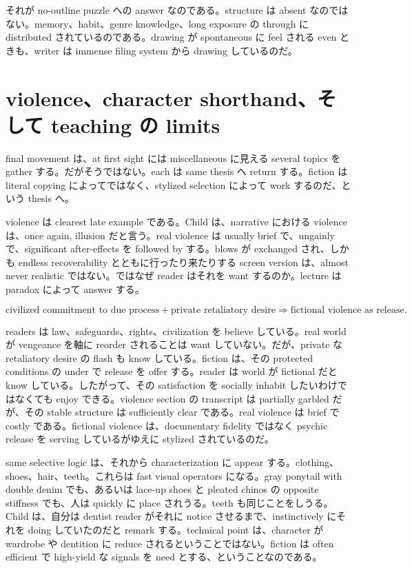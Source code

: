それが no-outline puzzle への answer なのである。structure は absent なのではない。memory、habit、genre knowledge、long exposure の through に distributed されているのである。drawing が spontaneous に feel される even ときも、writer は immense filing system から drawing しているのだ。

\section{violence、character shorthand、そして teaching の limits}

final movement は、at first sight には miscellaneous に見える several topics を gather する。だがそうではない。each は same thesis へ return する。fiction は literal copying によってではなく、stylized selection によって work するのだ、という thesis へ。

violence は clearest late example である。Child は、narrative における violence は、once again, illusion だと言う。real violence は usually brief で、ungainly で、significant after-effects を followed by する。blows が exchanged され、しかも endless recoverability とともに行ったり来たりする screen version は、almost never realistic ではない。ではなぜ reader はそれを want するのか。lecture は paradox によって answer する。

\begin{equation}
\text{civilized commitment to due process} + \text{private retaliatory desire}
\Longrightarrow
\text{fictional violence as release}.
\end{equation}

readers は law、safeguards、rights、civilization を believe している。real world が vengeance を軸に reorder されることは want していない。だが、private な retaliatory desire の flash も know している。fiction は、その protected conditions の under で release を offer する。reader は world が fictional だと know している。したがって、その satisfaction を socially inhabit したいわけではなくても enjoy できる。violence section の transcript は partially garbled だが、その stable structure は sufficiently clear である。real violence は brief で costly である。fictional violence は、documentary fidelity ではなく psychic release を serving しているがゆえに stylized されているのだ。

same selective logic は、それから characterization に appear する。clothing、shoes、hair、teeth。これらは fast visual operators になる。gray ponytail with double denim でも、あるいは lace-up shoes と pleated chinos の opposite stiffness でも、人は quickly に place されうる。teeth も同じことをしうる。Child は、自分は dentist reader がそれに notice させるまで、instinctively にそれを doing していたのだと remark する。technical point は、character が wardrobe や dentition に reduce されるということではない。fiction は often efficient で high-yield な signals を need とする、ということなのである。

